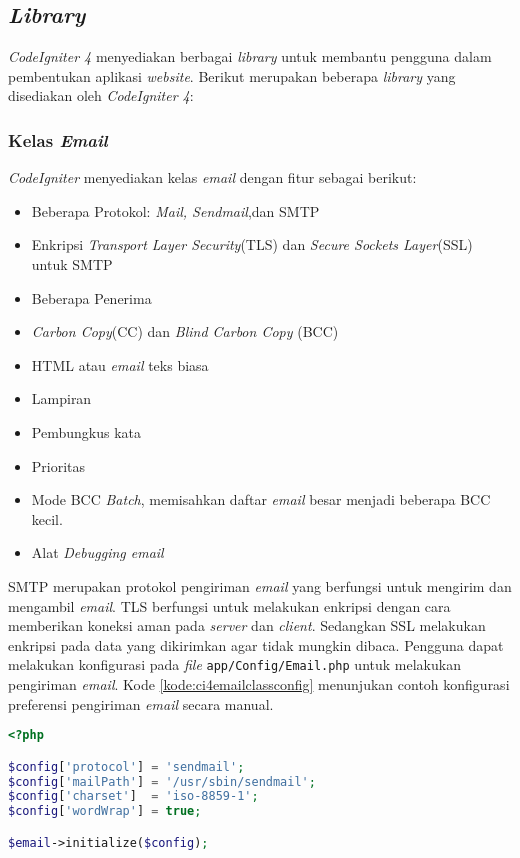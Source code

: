 \subsection{\textit{Library}}
\textit{CodeIgniter 4} menyediakan berbagai \textit{library} untuk membantu pengguna dalam pembentukan aplikasi \textit{website}. Berikut merupakan beberapa \textit{library} yang disediakan oleh \textit{CodeIgniter 4}:
\subsubsection{Kelas \textit{Email}}
\textit{CodeIgniter} menyediakan kelas \textit{email} dengan fitur sebagai berikut:
\begin{itemize}
\item Beberapa Protokol: \textit{Mail, Sendmail},dan SMTP
\item Enkripsi \textit{Transport Layer Security}(TLS) dan \textit{Secure Sockets Layer}(SSL) untuk SMTP
\item Beberapa Penerima
\item \textit{Carbon Copy}(CC) dan \textit{Blind Carbon Copy} (BCC)
\item HTML atau \textit{email} teks biasa
\item Lampiran
\item Pembungkus kata
\item Prioritas
\item Mode BCC \textit{Batch}, memisahkan daftar \textit{email} besar menjadi beberapa BCC kecil.
\item Alat \textit{Debugging email}
\end{itemize}

SMTP merupakan protokol pengiriman \textit{email} yang berfungsi untuk mengirim dan mengambil \textit{email}. TLS berfungsi untuk melakukan enkripsi dengan cara memberikan koneksi aman pada \textit{server} dan \textit{client}. Sedangkan SSL melakukan enkripsi pada data yang dikirimkan agar tidak mungkin dibaca. Pengguna dapat melakukan konfigurasi pada \textit{file} \verb|app/Config/Email.php| untuk melakukan pengiriman \textit{email}. Kode \ref{kode:ci4emailclassconfig} menunjukan contoh konfigurasi preferensi pengiriman \textit{email} secara manual.
 \begin{lstlisting}[language=PHP, caption=Contoh kode untuk melakukan konfigurasi \textit{email}. ,label=kode:ci4emailclassconfig]
<?php

$config['protocol'] = 'sendmail';
$config['mailPath'] = '/usr/sbin/sendmail';
$config['charset']  = 'iso-8859-1';
$config['wordWrap'] = true;

$email->initialize($config);
\end{lstlisting}

